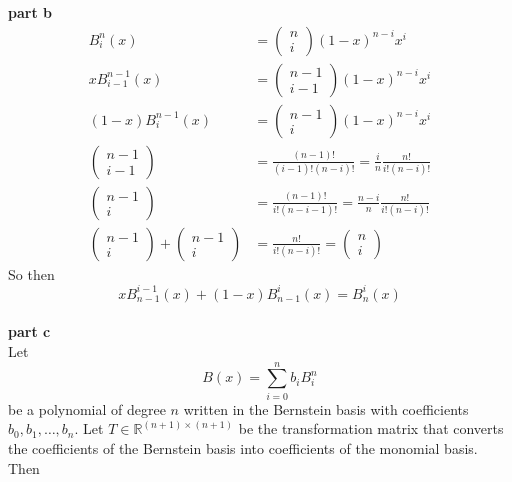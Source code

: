 \documentclass{article} %
\begin{document}
\textbf{part b} \\
\begin{align*}
B_i^n(x) &= \begin{pmatrix} n \\ i \end{pmatrix} (1-x)^{n-i}x^i \\
xB_{i-1}^{n-1}(x) &= \begin{pmatrix} n-1 \\ i - 1 \end{pmatrix} (1-x)^{n-i}x^{i} \\
(1-x)B_{i}^{n-1}(x) &= \begin{pmatrix} n-1 \\ i \end{pmatrix} (1-x)^{n-i}x^{i} \\
\begin{pmatrix} n-1 \\ i - 1 \end{pmatrix} &= \frac{(n-1)!}{(i-1)!(n-i)!} = \frac{i}{n} \frac{n!}{i!(n-i)!}\\
\begin{pmatrix} n-1 \\ i \end{pmatrix} &= \frac{(n-1)!}{i!(n-i-1)!} = \frac{n-i}{n} \frac{n!}{i!(n-i)!} \\
\begin{pmatrix} n-1 \\ i \end{pmatrix} + \begin{pmatrix} n-1 \\ i \end{pmatrix} &= \frac{n!}{i!(n-i)!} = \begin{pmatrix} n \\ i \end{pmatrix}
\end{align*}
So then
\begin{equation*}
xB_{n-1}^{i-1}(x) + (1-x)B_{n-1}^{i}(x) = B_n^i(x) 
\end{equation*}
\\
\textbf{part c} \\
Let 
\begin{equation*}
B(x) = \sum_{i=0}^n b_i B_i^n
\end{equation*}
be a polynomial of degree $n$ written in the Bernstein basis with coefficients $b_0, b_1, \hdots, b_n$.  Let $T \in \mathbb{R}^{(n+1)\times(n+1)}$ be the transformation matrix that converts the coefficients of the Bernstein basis into coefficients of the monomial basis.  Then
\end{document}

